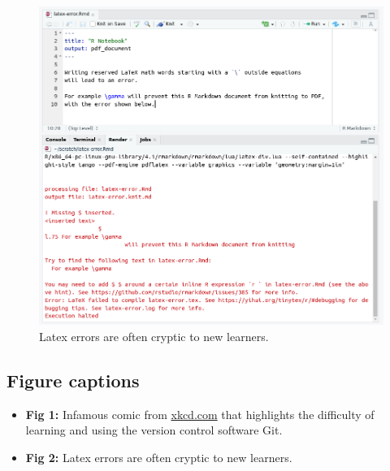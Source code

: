 \documentclass[
  12 pt,
]{paper}
\providecommand{\tightlist}{%
  \setlength{\itemsep}{0pt}\setlength{\parskip}{0pt}}
\begin{document}
\begin{figure}

{\centering \includegraphics[width=1\linewidth]{img/r-latex-error} 

}

\caption{Latex errors are often cryptic to new learners.}\label{fig:latex-errors}
\end{figure}

\newpage

\hypertarget{figure-captions}{%
\subsection{Figure captions}\label{figure-captions}}

\begin{itemize}
\tightlist
\item
  \textbf{Fig 1:} Infamous comic from \href{https://xkcd.com}{xkcd.com} that highlights the difficulty of learning and using the version control software Git.
\item
  \textbf{Fig 2:} Latex errors are often cryptic to new learners.
\end{itemize}

\newpage
\singlespace
\footnotesize

\printbibliography
\end{document}
